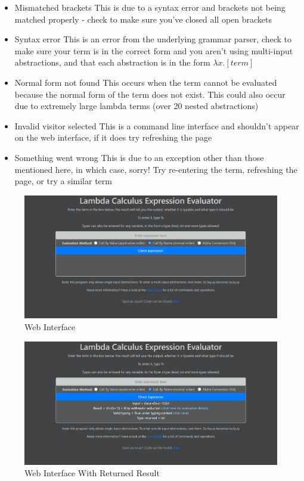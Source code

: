 \documentclass[a4paper,11pt]{article}
\begin{document}
\begin{itemize}
	\item Mismatched brackets
	\subitem This is due to a syntax error and brackets not being matched properly - check to make sure you've closed all open brackets
	\item Syntax error
	\subitem This is an error from the underlying grammar parser, check to make sure your term is in the correct form and you aren't using multi-input abstractions, and that each abstraction is in the form $\lambda x.[term]$
	\item Normal form not found
	\subitem This occurs when the term cannot be evaluated because the normal form of the term does not exist. This could also occur due to extremely large lambda terms (over 20 nested abstractions)
	\item Invalid visitor selected
	\subitem This is a command line interface and shouldn't appear on the web interface, if it does try refreshing the page
	\item Something went wrong
	\subitem This is due to an exception other than those mentioned here, in which case, sorry! Try re-entering the term, refreshing the page, or try a similar term
\end{itemize}

\begin{figure}[p]
	\includegraphics[scale=0.4]{images/web_interface_no_input}
	\centering
	\caption{Web Interface}
	\label{web_interface_no_input}
\end{figure}

\begin{figure}[p]
	\centering
	\includegraphics[scale=0.4]{images/web_interface_input}
	\caption{Web Interface With Returned Result}
	\label{web_interface_input}
\end{figure}
\end{document}
